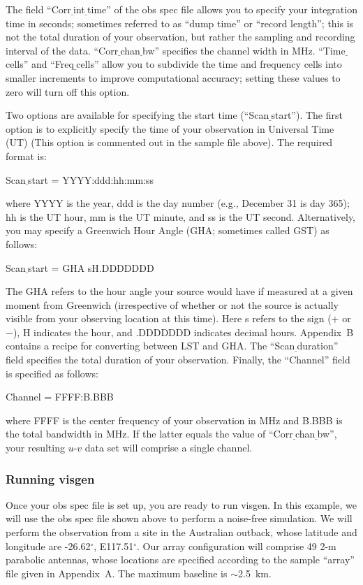 \documentclass[12pt,psfig]{article}
\begin{document}
The field ``Corr$\underline~$int$\underline~$time'' of the obs spec
file allows you to
specify your integration time in seconds; sometimes referred 
to as ``dump time'' or ``record
length''; this is not the total duration of your observation, but
rather the sampling and recording 
interval of the data.
``Corr$\underline~$chan$\underline~$bw'' specifies the channel width
in MHz. ``Time$\underline~$cells'' and ``Freq$\underline~$cells'' allow you to
subdivide the time and frequency cells into smaller increments to
improve computational accuracy; setting these values to zero will turn
off this option.

Two options are available for specifying the start time
(``Scan$\underline~$start''). The first option is to 
explicitly specify the time of your observation in Universal Time (UT)
(This option is commented out in the
sample file above). The required format is:

\bigskip

\noindent Scan$\underline~$start = YYYY:ddd:hh:mm:ss

\bigskip

\noindent where YYYY is the year, ddd is the day number (e.g.,
December 31 is day 365); hh is the UT hour, mm is the UT minute, and
ss is the UT second. Alternatively, you may specify a Greenwich 
Hour Angle (GHA;
sometimes called GST) as follows:

\bigskip
\noindent Scan$\underline~$start = GHA sH.DDDDDDD
\bigskip

\noindent The GHA refers to the hour angle your source
would have if measured at a given moment from Greenwich (irrespective of
whether or not the source is actually visible from your observing
location at this time). 
Here {\sf s} refers to the sign (+ or $-$), {\sf H}
indicates the hour, and {\sf .DDDDDDD} indicates decimal hours. 
Appendix~B contains a recipe for converting between LST and GHA.
The ``Scan$\underline~$duration'' field specifies the total duration
of your observation. 
Finally, the ``Channel'' field is specified as follows:

\bigskip

\noindent Channel = FFFF:B.BBB

\bigskip

\noindent where FFFF is the center frequency of your observation in
MHz and B.BBB is the total bandwidth in MHz. If the latter equals the
value of ``Corr$\underline~$chan$\underline~$bw'', your resulting
$u$-$v$ data set will comprise a single channel.

\subsubsection{Running {\sf visgen}}
%
Once your obs spec file is set up, you are ready to run {\sf
visgen}. In this example, we will use the obs spec file shown above
to perform a noise-free simulation. We will perform the observation
from a site in the Australian outback, whose latitude and
longitude are -26.62$^{\circ}$, 
E117.51$^{\circ}$. Our array configuration will comprise 49 2-m
parabolic antennas,
whose locations are specified according to the sample ``array'' file given
in Appendix~A. The maximum baseline is $\sim$2.5~km.
\end{document}
